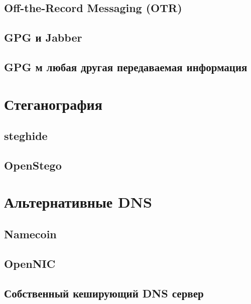 \subsection{Off-the-Record Messaging (OTR)}
\subsection{GPG и Jabber}
\subsection{GPG м любая другая передаваемая информация}

\section{Стеганография}
\subsection{steghide}
\subsection{OpenStego}

\section{Альтернативные DNS}
\subsection{Namecoin}
\subsection{OpenNIC}
\subsection{Собственный кеширующий DNS сервер}
